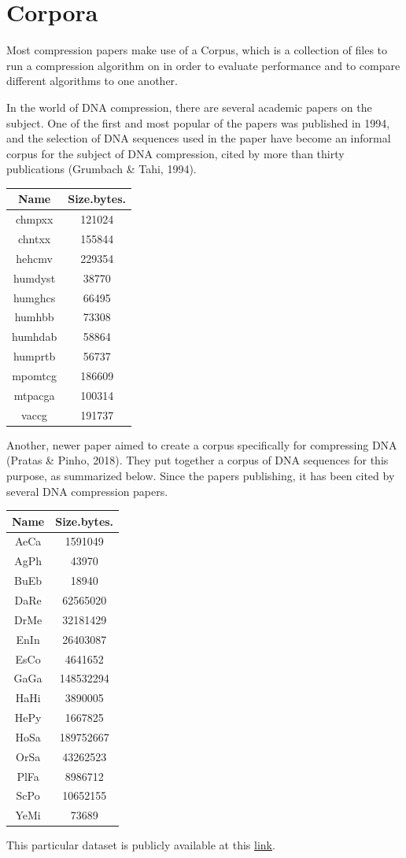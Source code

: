 \documentclass[12pt,twoside]{reedthesis}
\begin{document}
\hypertarget{corpora}{%
\section{Corpora}\label{corpora}}

Most compression papers make use of a Corpus, which is a collection of files to run a compression algorithm on in order to evaluate performance and to compare different algorithms to one another.

In the world of DNA compression, there are several academic papers on the subject. One of the first and most popular of the papers was published in 1994, and the selection of DNA sequences used in the paper have become an informal corpus for the subject of DNA compression, cited by more than thirty publications (Grumbach \& Tahi, 1994).
\begin{longtable}[]{@{}cc@{}}
\toprule()
Name & Size.bytes. \\
\midrule()
\endhead
chmpxx & 121024 \\
chntxx & 155844 \\
hehcmv & 229354 \\
humdyst & 38770 \\
humghcs & 66495 \\
humhbb & 73308 \\
humhdab & 58864 \\
humprtb & 56737 \\
mpomtcg & 186609 \\
mtpacga & 100314 \\
vaccg & 191737 \\
\bottomrule()
\end{longtable}
Another, newer paper aimed to create a corpus specifically for compressing DNA (Pratas \& Pinho, 2018). They put together a corpus of DNA sequences for this purpose, as summarized below. Since the papers publishing, it has been cited by several DNA compression papers.
\begin{longtable}[]{@{}cc@{}}
\toprule()
Name & Size.bytes. \\
\midrule()
\endhead
AeCa & 1591049 \\
AgPh & 43970 \\
BuEb & 18940 \\
DaRe & 62565020 \\
DrMe & 32181429 \\
EnIn & 26403087 \\
EsCo & 4641652 \\
GaGa & 148532294 \\
HaHi & 3890005 \\
HePy & 1667825 \\
HoSa & 189752667 \\
OrSa & 43262523 \\
PlFa & 8986712 \\
ScPo & 10652155 \\
YeMi & 73689 \\
\bottomrule()
\end{longtable}
This particular dataset is publicly available at this \href{https://tinyurl.com/DNAcorpus}{link}.
\end{document}
